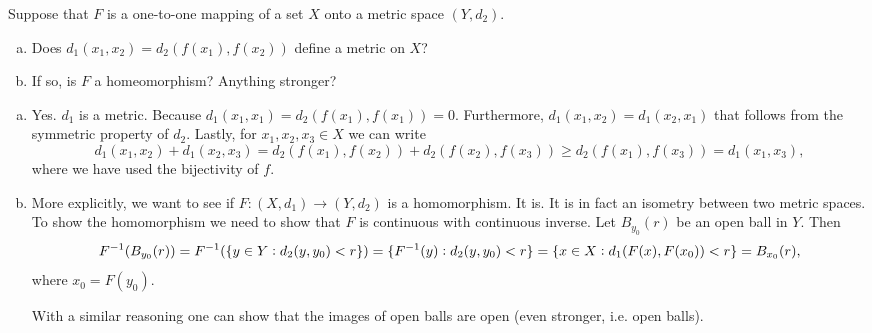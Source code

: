 \begin{problem}
	Suppose that $ F $ is a one-to-one mapping of a set $ X $ onto a metric space $ (Y,d_2) $. 
	\begin{enumerate}[(a)]
		\item Does $ d_1(x_1,x_2) = d_2(f(x_1),f(x_2)) $ define a metric on $ X $?
		\item If so, is $ F $ a homeomorphism? Anything stronger?
	\end{enumerate}
\end{problem}
\begin{solution}
	\begin{enumerate}[(a)]
		\item Yes. $ d_1 $ is a metric. Because $ d_1(x_1,x_1) = d_2(f(x_1),f(x_1)) = 0 $. Furthermore, $ d_1(x_1,x_2) = d_1(x_2,x_1) $ that follows from the symmetric property of $ d_2 $. Lastly, for $ x_1,x_2,x_3 \in X $ we can write
		\[ d_1(x_1,x_2) + d_1(x_2,x_3) = d_2(f(x_1),f(x_2)) + d_2(f(x_2),f(x_3)) \geq d_2(f(x_1),f(x_3)) = d_1(x_1,x_3), \]
		where we have used the bijectivity of $ f $.
		
		\item More explicitly, we want to see if $ F: (X,d_1) \to (Y,d_2) $ is a homomorphism. It is. It is in fact an isometry between two metric spaces. To show the homomorphism we need to show that $ F $ is continuous with continuous inverse. Let $ B_{y_0}(r) $ be an open ball in $ Y $. Then
		\[ F^{-1}(B_{y_0}(r)) = F^{-1}(\{y\in Y: d_2(y,y_0)<r\}) = \{F^{-1}(y): d_2(y,y_0)<r\} = \{x\in X: d_1(F(x),F(x_0)) < r\} = B_{x_0}(r), \]
		where $ x_0 = F(y_0). $
		
		With a similar reasoning one can show that the images of open balls are open (even stronger, i.e. open balls). 
		\end{enumerate}
\end{solution}


